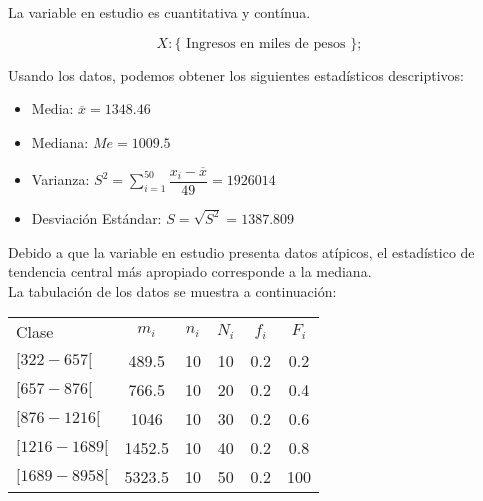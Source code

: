 \begin{solution}
La variable en estudio es cuantitativa y contínua.

$$X: \{\text{ Ingresos en miles de pesos }\};$$

Usando los datos, podemos obtener los siguientes estadísticos descriptivos:

\begin{itemize}
\item Media: $\overline{x}=1348.46$
\item Mediana: $Me=1009.5$
\item Varianza: $S^2 = \sum_{i=1}^{50} \dfrac{x_i - \overline{x}}{49}= 1926014$
\item Desviación Estándar: $S=\sqrt{S^2}=1387.809$
\end{itemize}

Debido a que la variable en estudio presenta datos atípicos, el estadístico de tendencia central más apropiado corresponde a la mediana.\\


La tabulación de los datos se muestra a continuación:
\begin{center}
\begin{tabular}{lccccc}
Clase           & $m_i$  & $n_i$ & $N_i$ & $f_i$ & $F_i$ \\
$[322 - 657[$   & 489.5  & 10    & 10    & 0.2   & 0.2   \\
$[657 - 876[$   & 766.5  & 10    & 20    & 0.2   & 0.4   \\
$[876 - 1216[$  & 1046   & 10    & 30    & 0.2   & 0.6   \\
$[1216 - 1689[$ & 1452.5 & 10    & 40    & 0.2   & 0.8   \\
$[1689 - 8958[$ & 5323.5 & 10    & 50    & 0.2   & 100  
\end{tabular}
\end{center}

\end{solution}